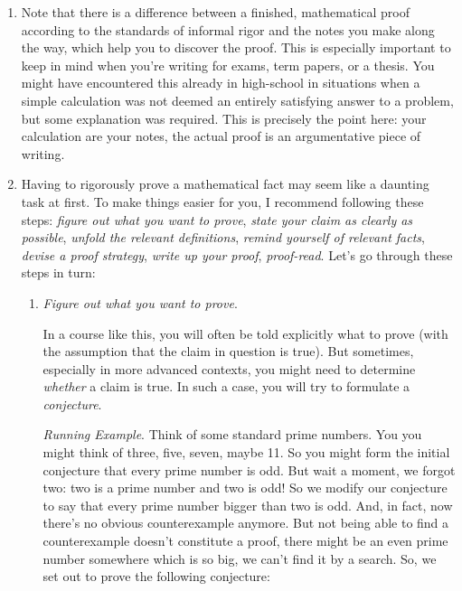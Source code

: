 \begin{enumerate}[{\thesection}.1]
	 \item Note that there is a difference between a finished, mathematical proof according to the standards of informal rigor and the notes you make along the way, which help you to discover the proof. This is especially important to keep in mind when you're writing for exams, term papers, or a thesis. You might have encountered this already in high-school in situations when a simple calculation was not deemed an entirely satisfying answer to a problem, but some explanation was required. This is precisely the point here: your calculation are your notes, the actual proof is an argumentative piece of writing. 
	 
	 \item Having to rigorously prove a mathematical fact may seem like a daunting task at first. To make things easier for you, I recommend following these steps:  \emph{figure out what you want to prove}, \emph{state your claim as clearly as possible}, \emph{unfold the relevant definitions}, \emph{remind yourself of relevant facts}, \emph{devise a proof strategy}, \emph{write up your proof}, \emph{proof-read}. Let's go through these steps in turn:

	 
	 	\begin{enumerate}[\thesection.{7}.1]
		
			\item \emph{Figure out what you want to prove}.
							
				In a course like this, you will often be told explicitly what to prove (with the assumption that the claim in question is true). But sometimes, especially in more advanced contexts, you might need to determine \emph{whether} a claim is true. In such a case, you will try to formulate a \emph{conjecture}.
				
				\vspace{2ex}
				
				\emph{Running Example}. Think of some standard prime numbers. You you might think of three, five, seven, maybe 11. So you might form the initial conjecture that every prime number is odd. But wait a moment, we forgot two: two is a prime number and two is odd! So we modify our conjecture to say that every prime number bigger than two is odd. And, in fact, now there's no obvious counterexample anymore. But not being able to find a counterexample doesn't constitute a proof, there might be an even prime number somewhere which is so big, we can't find it by a search. So, we set out to prove the following conjecture: 
				

\end{enumerate}
\end{enumerate}
